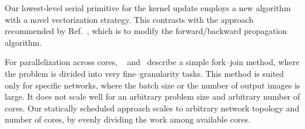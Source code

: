   Our lowest-level serial primitive for the kernel update employs a
  new algorithm with a novel vectorization strategy. This contrasts
  with the approach recommended by Ref.~\cite{chellapilla2006high},
  which is to modify the forward/backward propagation algorithm.

  For parallelization across cores,  ~\cite{chellapilla2006high} and~\cite{das2016distributed} describe a simple fork--join method, where the
  problem is divided into very fine--granularity tasks.
  This method is suited only for specific networks, where the batch
  size or the number of output images is large.  It does not scale
  well for an arbitrary problem size and arbitrary number of cores.
  Our statically scheduled approach scales to arbitrary network
  topology and number of cores, by evenly dividing the work among
  available cores.


